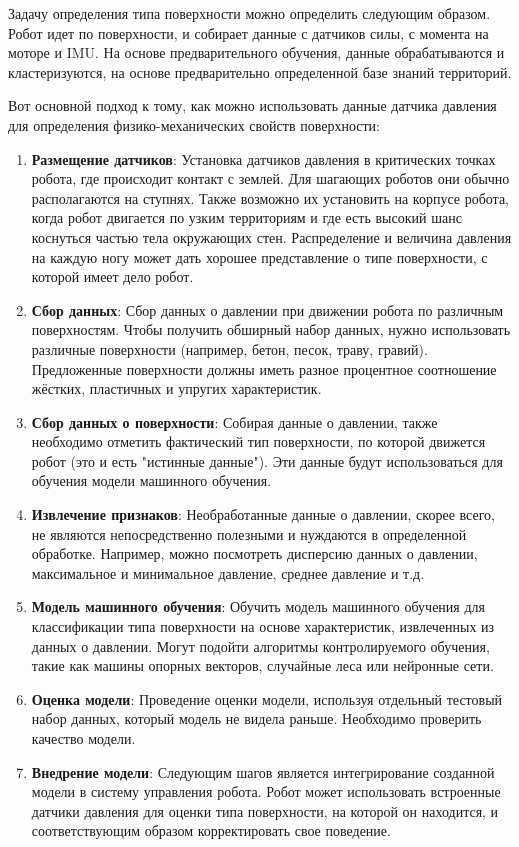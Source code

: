 Задачу определения типа поверхности можно определить следующим образом. Робот идет по поверхности, и собирает данные с датчиков силы, с момента на моторе и IMU. На основе предварительного обучения, данные обрабатываются и кластеризуются, на основе предварительно определенной базе знаний территорий.

Вот основной подход к тому, как можно использовать данные датчика давления для определения физико-механических свойств поверхности:

\begin{enumerate}
    \item \textbf{Размещение датчиков}: Установка датчиков давления в критических точках робота, где происходит контакт с землей. Для шагающих роботов они обычно располагаются на ступнях. Также возможно их установить на корпусе робота, когда робот двигается по узким территориям и где есть высокий шанс коснуться частью тела окружающих стен. Распределение и величина давления на каждую ногу может дать хорошее представление о типе поверхности, с которой имеет дело робот.

    \item \textbf{Сбор данных}: Сбор данных о давлении при движении робота по различным поверхностям. Чтобы получить обширный набор данных, нужно использовать различные поверхности (например, бетон, песок, траву, гравий). Предложенные поверхности должны иметь разное процентное соотношение жёстких, пластичных и упругих характеристик. 

    \item \textbf{Сбор данных о поверхности}: Собирая данные о давлении, также необходимо отметить фактический тип поверхности, по которой движется робот (это и есть "истинные данные"). Эти данные будут использоваться для обучения модели машинного обучения.

\item \textbf{Извлечение признаков}: Необработанные данные о давлении, скорее всего, не являются непосредственно полезными и нуждаются в определенной обработке. Например, можно посмотреть дисперсию данных о давлении, максимальное и минимальное давление, среднее давление и т.д.

    \item \textbf{Модель машинного обучения}: Обучить модель машинного обучения для классификации типа поверхности на основе характеристик, извлеченных из данных о давлении. Могут подойти алгоритмы контролируемого обучения, такие как машины опорных векторов, случайные леса или нейронные сети.

    \item \textbf{Оценка модели}: Проведение оценки модели, используя отдельный тестовый набор данных, который модель не видела раньше. Необходимо проверить качество модели.

   \item \textbf{Внедрение модели}: Следующим шагов является интегрирование созданной модели в систему управления робота. Робот может использовать встроенные датчики давления для оценки типа поверхности, на которой он находится, и соответствующим образом корректировать свое поведение.
\end{enumerate}


